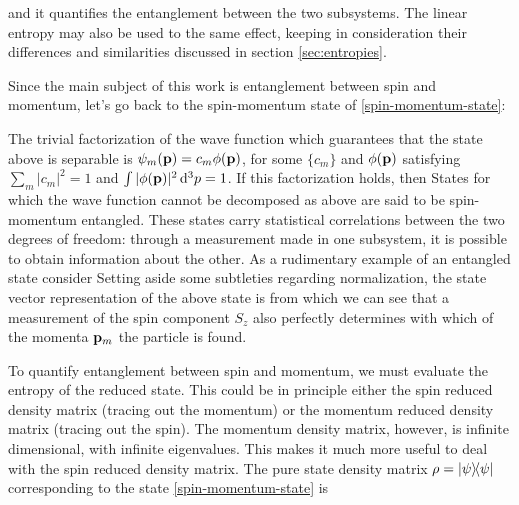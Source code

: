 \documentclass[12pt,a4paper,notitlepage]{report}
\begin{document}
%
and it quantifies the entanglement between the two subsystems. The linear entropy may also be used to the same effect, keeping in consideration their differences and similarities discussed in section \ref{sec:entropies}.

Since the main subject of this work is entanglement between spin and momentum, let's go back to the spin-momentum state of \eqref{spin-momentum-state}:

%
The trivial factorization of the wave function which guarantees that the state above is separable is $\psi_m(\vb{p}) = c_m \phi(\vb{p})$, for some $\{c_m\}$ and $\phi(\vb{p})$ satisfying $\sum_m |c_m|^2 = 1$ and $\int |\phi(\vb{p})|^2 \dd[3]{p} = 1$. If this factorization holds, then
%
%
States for which the wave function cannot be decomposed as above are said to be spin-momentum entangled. These states carry statistical correlations between the two degrees of freedom: through a measurement made in one subsystem, it is possible to obtain information about the other. As a rudimentary example of an entangled state consider
%
%
Setting aside some subtleties regarding normalization, the state vector representation of the above state is
%
%
from which we can see that a measurement of the spin component $S_z$ also perfectly determines with which of the momenta $\vb{p}_m$ the particle is found.

To quantify entanglement between spin and momentum, we must evaluate the entropy of the reduced state. This could be in principle either the spin reduced density matrix (tracing out the momentum) or the momentum reduced density matrix (tracing out the spin). The momentum density matrix, however, is infinite dimensional, with infinite eigenvalues. This makes it much more useful to deal with the spin reduced density matrix. The pure state density matrix $\rho = \dyad{\psi}$ corresponding to the state \eqref{spin-momentum-state} is
\end{document}
